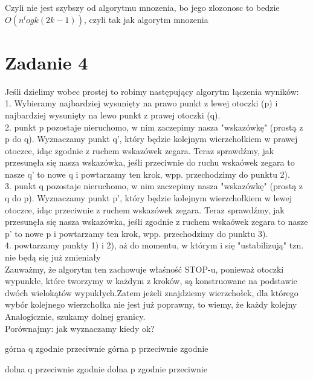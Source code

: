 \documentclass[12pt]{article}
\begin{document}
Czyli nie jest szybszy od algorytmu mnozenia, bo jego zlozonosc to bedzie 
$O(n^logk(2k-1))$, czyli tak jak algorytm mnozenia



\section{Zadanie 4}

Jeśli dzielimy wobec prostej to robimy następujący algorytm łączenia wyników:\\

1. Wybieramy najbardziej wysunięty na prawo punkt z lewej otoczki (p) i najbardziej wysunięty na lewo punkt z prawej otoczki (q).\\

2. punkt p pozostaje nieruchomo, w nim zaczepimy nasza "wskazówkę" (prostą z p do q). Wyznaczamy punkt q', który będzie kolejnym wierzchołkiem w prawej otoczce, idąc zgodnie z ruchem wskazówek zegara. Teraz sprawdźmy, jak przesunęła się nasza wskazówka, jeśli przeciwnie do ruchu wskaówek zegara to nasze q' to nowe q i powtarzamy ten krok, wpp. przechodzimy do punktu 2).\\

3. punkt q pozostaje nieruchomo, w nim zaczepimy nasza "wskazówkę" (prostą z q do p). Wyznaczamy punkt p', który będzie kolejnym wierzchołkiem w lewej otoczce, idąc przeciwnie z ruchem wskazówek zegara. Teraz sprawdźmy, jak przesunęła się nasza wskazówka, jeśli zgodnie z ruchem wskaówek zegara to nasze p' to nowe p
i powtarzamy ten krok, wpp. przechodzimy do punktu 3).\\

4. powtarzamy punkty 1) i 2), aż do momentu, w którym
i się "ustabilizują" tzn. nie będą się już zmieniały\\

Zauważmy, że algorytm ten zachowuje właśność STOP-u, ponieważ otoczki wypunkłe, które tworzymy w każdym z kroków, są konstruowane na podstawie dwóch wielokątów wypukłych.Zatem jeżeli znajdziemy wierzchołek, dla którego wybór kolejnego wierzchołka nie jest już poprawny, to wiemy, że każdy kolejny\\

Analogicznie, szukamy dolnej granicy.\\
Porównajmy:
         jak wyznaczamy 	kiedy ok?
		
górna q 	zgodnie 	przeciwnie
górna p 	przeciwnie 	zgodnie
		
dolna q 	przeciwnie 	zgodnie
dolna p 	zgodnie 	przeciwnie\\
\end{document}
